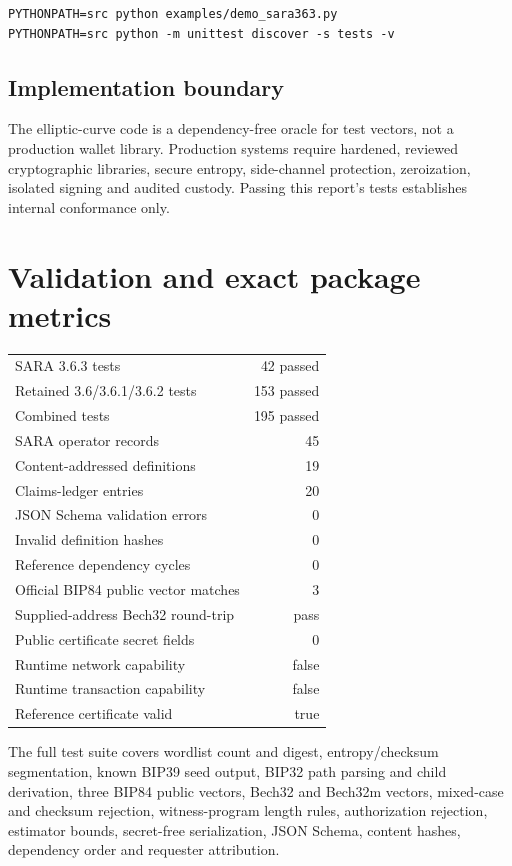 \documentclass[10pt,a4paper]{article}
\begin{document}
\begin{Verbatim}[breaklines=true,fontsize=\small]
PYTHONPATH=src python examples/demo_sara363.py
PYTHONPATH=src python -m unittest discover -s tests -v
\end{Verbatim}

\subsection{Implementation boundary}
The elliptic-curve code is a dependency-free oracle for test vectors, not a production wallet library. Production systems require hardened, reviewed cryptographic libraries, secure entropy, side-channel protection, zeroization, isolated signing and audited custody. Passing this report's tests establishes internal conformance only.

\section{Validation and exact package metrics}

\begin{metricbox}
\begin{tabularx}{0.96\textwidth}{X r}
SARA 3.6.3 tests & 42 passed\\
Retained 3.6/3.6.1/3.6.2 tests & 153 passed\\
Combined tests & 195 passed\\
SARA operator records & 45\\
Content-addressed definitions & 19\\
Claims-ledger entries & 20\\
JSON Schema validation errors & 0\\
Invalid definition hashes & 0\\
Reference dependency cycles & 0\\
Official BIP84 public vector matches & 3\\
Supplied-address Bech32 round-trip & pass\\
Public certificate secret fields & 0\\
Runtime network capability & false\\
Runtime transaction capability & false\\
Reference certificate valid & true\\
\end{tabularx}
\end{metricbox}

The full test suite covers wordlist count and digest, entropy/checksum segmentation, known BIP39 seed output, BIP32 path parsing and child derivation, three BIP84 public vectors, Bech32 and Bech32m vectors, mixed-case and checksum rejection, witness-program length rules, authorization rejection, estimator bounds, secret-free serialization, JSON Schema, content hashes, dependency order and requester attribution.
\end{document}
